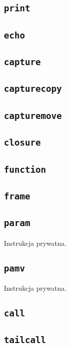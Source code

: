 \subsection{\texttt{print}}
\subsection{\texttt{echo}}

\subsection{\texttt{capture}}
\subsection{\texttt{capturecopy}}
\subsection{\texttt{capturemove}}

\subsection{\texttt{closure}}
\subsection{\texttt{function}}

\subsection{\texttt{frame}}
\subsection{\texttt{param}}

Instrukcja prywatna.

\subsection{\texttt{pamv}}

Instrukcja prywatna.

\subsection{\texttt{call}}
\subsection{\texttt{tailcall}}
